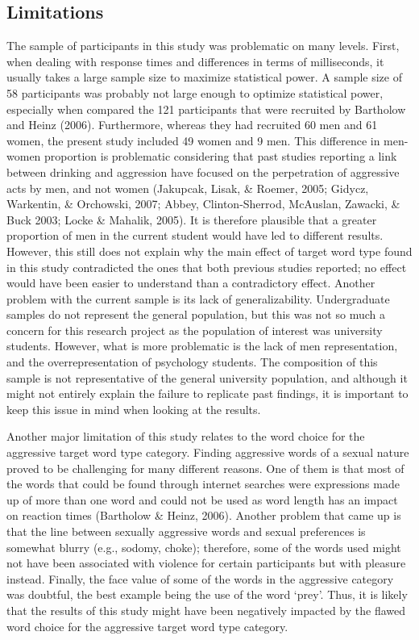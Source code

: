 \documentclass[authordate, serif, review]{jote-article}
\begin{document}
\begin{multicols}{2}
{}
\subsection*{Limitations}
The sample of participants in this study was problematic on many levels. First, when dealing with response times and differences in terms of milliseconds, it usually takes a large sample size to maximize statistical power. A sample size of 58 participants was probably not large enough to optimize statistical power, especially when compared the 121 participants that were recruited by Bartholow and Heinz (2006). Furthermore, whereas they had recruited 60 men and 61 women, the present study included 49 women and 9 men. This difference in men-women proportion is problematic considering that past studies reporting a link between drinking and aggression have focused on the perpetration of aggressive acts by men, and not women (Jakupcak, Lisak, \& Roemer, 2005; Gidycz, Warkentin, \& Orchowski, 2007; Abbey, Clinton-Sherrod, McAuslan, Zawacki, \& Buck 2003; Locke \& Mahalik, 2005). It is therefore plausible that a greater proportion of men in the current student would have led to different results. However, this still does not explain why the main effect of target word type found in this study contradicted the ones that both previous studies reported; no effect would have been easier to understand than a contradictory effect. Another problem with the current sample is its lack of generalizability. Undergraduate samples do not represent the general population, but this was not so much a concern for this research project as the population of interest was university students. However, what is more problematic is the lack of men representation, and the overrepresentation of psychology students. The composition of this sample is not representative of the general university population, and although it might not entirely explain the failure to replicate past findings, it is important to keep this issue in mind when looking at the results.  

Another major limitation of this study relates to the word choice for the aggressive target word type category. Finding aggressive words of a sexual nature proved to be challenging for many different reasons. One of them is that most of the words that could be found through internet searches were expressions made up of more than one word and could not be used as word length has an impact on reaction times (Bartholow \& Heinz, 2006). Another problem that came up is that the line between sexually aggressive words and sexual preferences is somewhat blurry (e.g., sodomy, choke); therefore, some of the words used might not have been associated with violence for certain participants but with pleasure instead. Finally, the face value of some of the words in the aggressive category was doubtful, the best example being the use of the word `prey'. Thus, it is likely that the results of this study might have been negatively impacted by the flawed word choice for the aggressive target word type category.  


\end{multicols}
\end{document}
